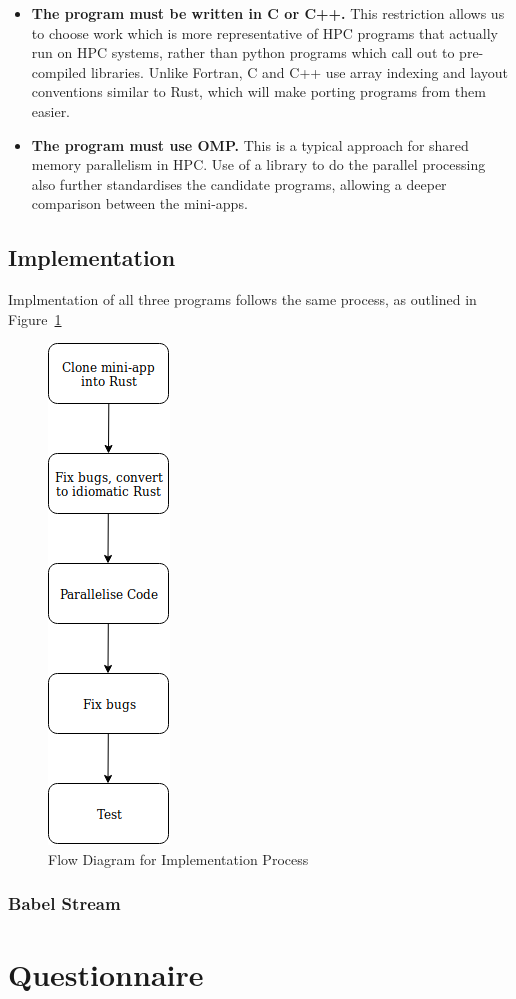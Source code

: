\begin{itemize}
  \item \textbf{The program must be written in C or C++.} This restriction allows us to choose work which is more representative of HPC programs that actually run on HPC systems, rather than python programs which call out to pre-compiled libraries. Unlike Fortran, C and C++ use array indexing and layout conventions similar to Rust, which will make porting programs from them easier.

  \item \textbf{The program must use OMP.} This is a typical approach for shared memory parallelism in HPC. Use of a library to do the parallel processing also further standardises the candidate programs, allowing a deeper comparison between the mini-apps.
\end{itemize}

\subsection{Implementation}
Implmentation of all three programs follows the same process, as outlined in Figure~\ref{fig:imp-flow}
\begin{figure}
  \center
  \includegraphics{figs/ImplementationFlow.png}
  \caption{Flow Diagram for Implementation Process}
  \label{fig:imp-flow}
\end{figure}
\subsubsection{Babel Stream}

\section{Questionnaire}
